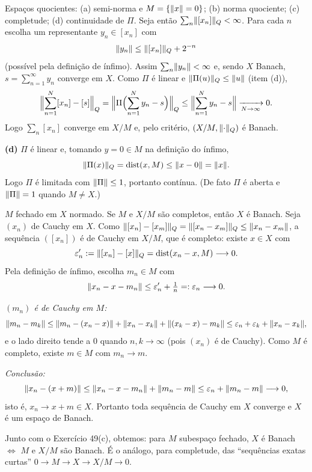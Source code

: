 \begin{exercicio}{Espaços quocientes: (a) semi-norma e $M=\{\lVert x\rVert=0\}$; (b) norma quociente; (c) completude; (d) continuidade de $\Pi$.}
Seja então $\sum_n\lVert[x_n]\rVert_Q<\infty$. Para cada $n$ escolha um representante $y_n\in[x_n]$ com
\[ \lVert y_n\rVert\le\lVert[x_n]\rVert_Q+2^{-n} \]
(possível pela definição de ínfimo). Assim $\sum_n\lVert y_n\rVert<\infty$ e, sendo $X$ Banach, $s=\sum_{n=1}^\infty y_n$ converge em $X$. Como $\Pi$ é linear e $\lVert\Pi(u)\rVert_Q\le\lVert u\rVert$ (item (d)),
\[ \Bigl\|\sum_{n=1}^{N}[x_n]-[s]\Bigr\|_Q=\Bigl\|\Pi\Bigl(\sum_{n=1}^{N}y_n-s\Bigr)\Bigr\|_Q\le\Bigl\|\sum_{n=1}^{N}y_n-s\Bigr\|\xrightarrow[N\to\infty]{}0. \]
Logo $\sum_n[x_n]$ converge em $X/M$ e, pelo critério, $(X/M,\lVert\cdot\rVert_Q)$ é Banach.

\textbf{(d)} $\Pi$ é linear e, tomando $y=0\in M$ na definição do ínfimo,
\[ \lVert\Pi(x)\rVert_Q=\operatorname{dist}(x,M)\le\lVert x-0\rVert=\lVert x\rVert. \]
Logo $\Pi$ é limitada com $\lVert\Pi\rVert\le1$, portanto contínua. (De fato $\Pi$ é aberta e $\lVert\Pi\rVert=1$ quando $M\neq X$.)
\end{exercicio}

\begin{exercicio}{$M$ fechado em $X$ normado. Se $M$ e $X/M$ são completos, então $X$ é Banach.}
\sol
Seja $(x_n)$ de Cauchy em $X$. Como $\lVert[x_n]-[x_m]\rVert_Q=\lVert[x_n-x_m]\rVert_Q\le\lVert x_n-x_m\rVert$, a sequência $([x_n])$ é de Cauchy em $X/M$, que é completo: existe $x\in X$ com
\[ \varepsilon_n':=\lVert[x_n]-[x]\rVert_Q=\operatorname{dist}(x_n-x,M)\longrightarrow0. \]
Pela definição de ínfimo, escolha $m_n\in M$ com
\[ \lVert x_n-x-m_n\rVert\le\varepsilon_n'+\tfrac1n=:\varepsilon_n\longrightarrow0. \]

\emph{$(m_n)$ é de Cauchy em $M$:}
\[ \lVert m_n-m_k\rVert\le\lVert m_n-(x_n-x)\rVert+\lVert x_n-x_k\rVert+\lVert(x_k-x)-m_k\rVert\le\varepsilon_n+\varepsilon_k+\lVert x_n-x_k\rVert, \]
e o lado direito tende a $0$ quando $n,k\to\infty$ (pois $(x_n)$ é de Cauchy). Como $M$ é completo, existe $m\in M$ com $m_n\to m$.

\emph{Conclusão:}
\[ \lVert x_n-(x+m)\rVert\le\lVert x_n-x-m_n\rVert+\lVert m_n-m\rVert\le\varepsilon_n+\lVert m_n-m\rVert\longrightarrow0, \]
isto é, $x_n\to x+m\in X$. Portanto toda sequência de Cauchy em $X$ converge e $X$ é um espaço de Banach.

\begin{obs}
Junto com o Exercício 49(c), obtemos: para $M$ subespaço fechado, $X$ é Banach $\iff$ $M$ e $X/M$ são Banach. É o análogo, para completude, das ``sequências exatas curtas'' $0\to M\to X\to X/M\to 0$.
\end{obs}
\end{exercicio}
